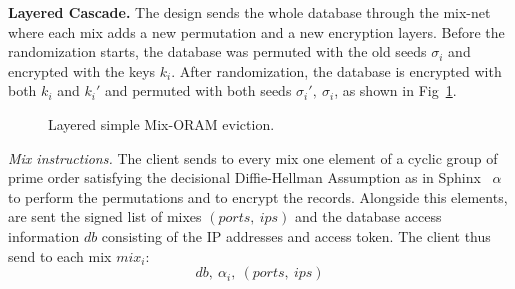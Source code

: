 \documentclass[USenglish,oneside,twocolumn]{article}
\begin{document}
\noindent\textbf{Layered Cascade.} The design sends the whole database through the mix-net where each mix adds a new permutation and a new encryption layers. Before the randomization starts, the database was permuted with the old seeds $\sigma_i$ and encrypted with the keys $k_i$. After randomization, the database is encrypted with both $k_i$ and $k_i'$ and permuted with both seeds $\sigma_i',\ \sigma_i$, as shown in Fig~\ref{fig:ASMO_L}.\\
%
\begin{figure}[H]
\begin{minipage}{0.475\textwidth}
\begin{adjustbox}{width=\textwidth}
\centering
{}
\end{adjustbox}
\centering
\caption{Layered simple Mix-ORAM eviction.} \label{fig:ASMO_L}
\end{minipage}
\end{figure} 

\noindent\textit{Mix instructions.}
The client sends to every mix one element of a cyclic group of prime order satisfying the decisional Diffie-Hellman Assumption as in Sphinx~\cite{danezis2009sphinx} $\alpha$ to perform the permutations and to encrypt the records. Alongside this elements, are sent the signed list of mixes $(ports,\ ips)$ and the database access information $db$ consisting of the IP addresses and access token. The client thus send to each mix $mix_i$:
$$ db,\ \alpha_{i},\ (ports,\ ips) $$
\end{document}
